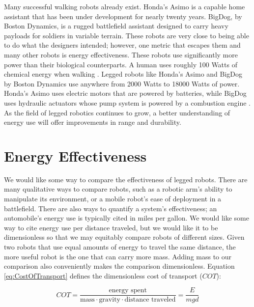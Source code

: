 Many successful walking robots already exist. Honda's Asimo is a capable home assistant that has been under development for nearly twenty years. BigDog, by Boston Dynamics, is a rugged battlefield assistant designed to carry heavy payloads for soldiers in variable terrain. These robots are very close to being able to do what the designers intended; however, one metric that escapes them and many other robots is energy effectiveness. These robots use significantly more power than their biological  counterparts. A human uses roughly 100 Watts of chemical energy when walking \cite{wilson04}. Legged robots like Honda's Asimo and BigDog by Boston Dynamics use anywhere from 2000 Watts to 18000 Watts of power. Honda's Asimo uses electric motors that are powered by batteries, while BigDog uses hydraulic actuators whose pump system is powered by a combustion engine \cite{needed}. As the field of legged robotics continues to grow, a better understanding of energy use will offer improvements in range and durability.

\section{Energy Effectiveness} %
\label{sec:EnergyEffectiveness}

We would like some way to compare the effectiveness of legged robots. There are many qualitative ways to compare robots, such as a robotic arm's ability to manipulate its environment, or a mobile robot's ease of deployment in a battlefield. There are also ways to quantify a system's effectiveness; an automobile's energy use is typically cited in miles per gallon. We would like some way to cite energy use per distance traveled, but we would like it to be dimensionless so that we may equitably compare robots of different sizes. Given two robots that use equal amounts of energy to travel the same distance, the more useful robot is the one that can carry more mass. Adding mass to our comparison also conveniently makes the comparison dimensionless. Equation \ref{eq:CostOfTransport} defines the dimensionless cost of transport ($COT$):

\begin{equation}
COT = \frac{\mbox{energy spent}} {\mbox{mass}\cdot\mbox{gravity}\cdot\mbox{distance traveled}}=\frac{E}{mgd}
\label{eq:CostOfTransport}
\end{equation}

